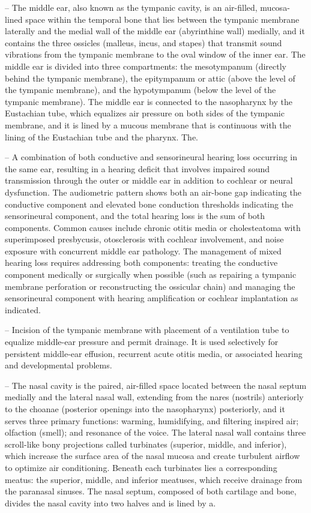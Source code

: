 -- The middle ear, also known as the tympanic cavity, is an air-filled, mucosa-lined space within the temporal bone that lies between the tympanic membrane laterally and the medial wall of the middle ear (abyrinthine wall) medially, and it contains the three ossicles (malleus, incus, and stapes) that transmit sound vibrations from the tympanic membrane to the oval window of the inner ear. The middle ear is divided into three compartments: the mesotympanum (directly behind the tympanic membrane), the epitympanum or attic (above the level of the tympanic membrane), and the hypotympanum (below the level of the tympanic membrane). The middle ear is connected to the nasopharynx by the Eustachian tube, which equalizes air pressure on both sides of the tympanic membrane, and it is lined by a mucous membrane that is continuous with the lining of the Eustachian tube and the pharynx. The.

-- A combination of both conductive and sensorineural hearing loss occurring in the same ear, resulting in a hearing deficit that involves impaired sound transmission through the outer or middle ear in addition to cochlear or neural dysfunction. The audiometric pattern shows both an air-bone gap indicating the conductive component and elevated bone conduction thresholds indicating the sensorineural component, and the total hearing loss is the sum of both components. Common causes include chronic otitis media or cholesteatoma with superimposed presbycusis, otosclerosis with cochlear involvement, and noise exposure with concurrent middle ear pathology. The management of mixed hearing loss requires addressing both components: treating the conductive component medically or surgically when possible (such as repairing a tympanic membrane perforation or reconstructing the ossicular chain) and managing the sensorineural component with hearing amplification or cochlear implantation as indicated.

-- Incision of the tympanic membrane with placement of a ventilation tube to equalize middle-ear pressure and permit drainage. It is used selectively for persistent middle-ear effusion, recurrent acute otitis media, or associated hearing and developmental problems.

-- The nasal cavity is the paired, air-filled space located between the nasal septum medially and the lateral nasal wall, extending from the nares (nostrils) anteriorly to the choanae (posterior openings into the nasopharynx) posteriorly, and it serves three primary functions: warming, humidifying, and filtering inspired air; olfaction (smell); and resonance of the voice. The lateral nasal wall contains three scroll-like bony projections called turbinates (superior, middle, and inferior), which increase the surface area of the nasal mucosa and create turbulent airflow to optimize air conditioning. Beneath each turbinates lies a corresponding meatus: the superior, middle, and inferior meatuses, which receive drainage from the paranasal sinuses. The nasal septum, composed of both cartilage and bone, divides the nasal cavity into two halves and is lined by a.

